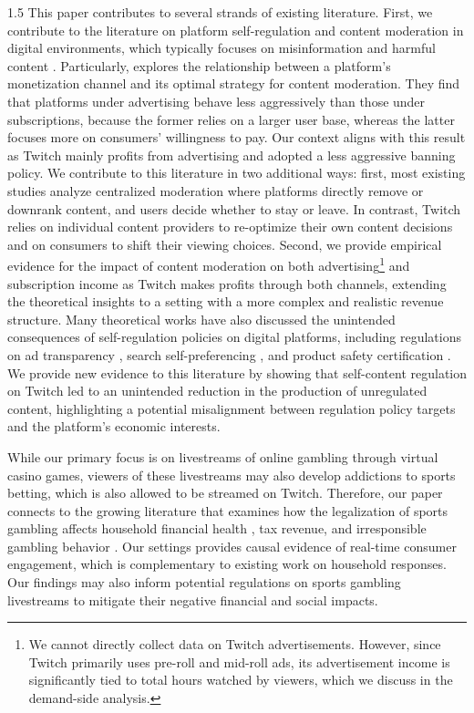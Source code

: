\documentclass[a4paper,12pt]{article}
\begin{document}
\begin{spacing}{1.5}
This paper contributes to several strands of existing literature. First, we contribute to the literature on platform self-regulation and content moderation in digital environments, which typically focuses on misinformation \citep{beck2023guardians, gandhi2023misinformation, ananthakrishnan2020tangled} and harmful content \citep{howard2019free,beknazar2022toxic,beknazar2024model}. Particularly, \citet{liu2022implications} explores the relationship between a platform's monetization channel and its optimal strategy for content moderation. They find that platforms under advertising behave less aggressively than those under subscriptions, because the former relies on a larger user base, whereas the latter focuses more on consumers' willingness to pay. Our context aligns with this result as Twitch mainly profits from advertising and adopted a less aggressive banning policy. We contribute to this literature in two additional ways: first, most existing studies analyze centralized moderation where platforms directly remove or downrank content, and users decide whether to stay or leave. In contrast, Twitch relies on individual content providers to re-optimize their own content decisions and on consumers to shift their viewing choices. Second, we provide empirical evidence for the impact of content moderation on both advertising\footnote{We cannot directly collect data on Twitch advertisements. However, since Twitch primarily uses pre-roll and mid-roll ads, its advertisement income is significantly tied to total hours watched by viewers, which we discuss in the demand-side analysis.} and subscription income as Twitch makes profits through both channels, extending the theoretical insights to a setting with a more complex and realistic revenue structure. Many theoretical works have also discussed the unintended consequences of self-regulation policies on digital platforms, including regulations on ad transparency \citep{wu2022regulating}, search self-preferencing \citep{zou2024self}, and product safety certification \citep{iyer2018voluntary}. We provide new evidence to this literature by showing that self-content regulation on Twitch led to an unintended reduction in the production of unregulated content, highlighting a potential misalignment between regulation policy targets and the platform's economic interests.

While our primary focus is on livestreams of online gambling through virtual casino games, viewers of these livestreams may also develop addictions to sports betting, which is also allowed to be streamed on Twitch. Therefore, our paper connects to the growing literature that examines how the legalization of sports gambling affects household financial health \citep{baker2024gambling,hollenbeck2024financial}, tax revenue, and irresponsible gambling behavior \citep{taylor2024online}. Our settings provides causal evidence of real-time consumer engagement, which is complementary to existing work on household responses. Our findings may also inform potential regulations on sports gambling livestreams to mitigate their negative financial and social impacts.


\end{spacing}
\end{document}
